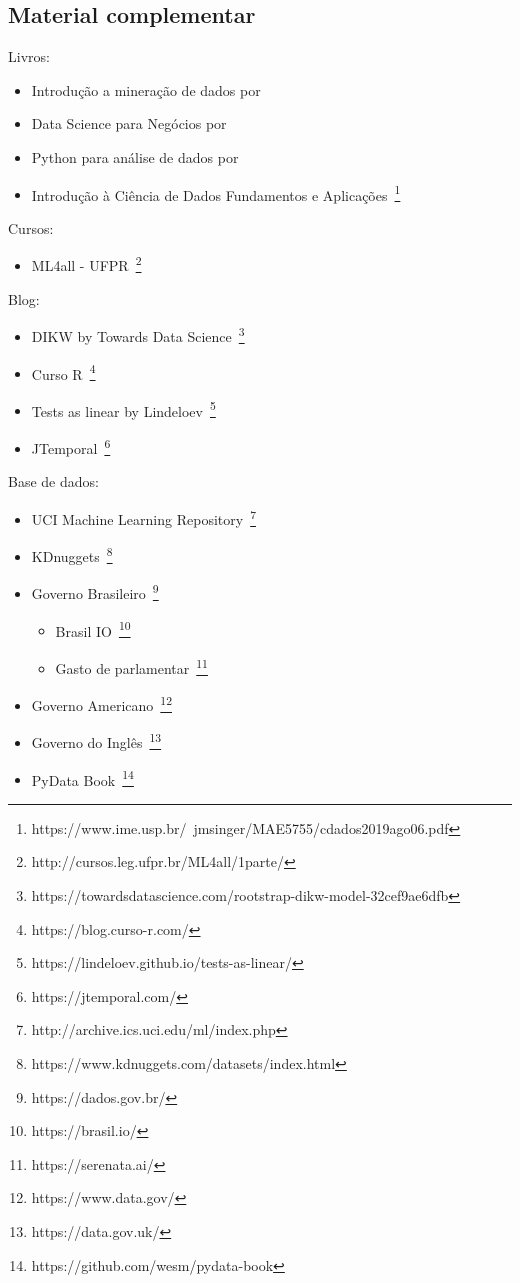 \subsection{Material complementar}

Livros:
\begin{itemize}
	\item Introdução a mineração de dados por~
	\item Data Science para Negócios por~
	\item Python para análise de dados por~
	\item Introdução à Ciência de Dados Fundamentos e Aplicações~\footnote{https://www.ime.usp.br/~jmsinger/MAE5755/cdados2019ago06.pdf}
\end{itemize}


Cursos:
\begin{itemize}
	\item ML4all - UFPR~\footnote{http://cursos.leg.ufpr.br/ML4all/1parte/}
\end{itemize}


Blog:
\begin{itemize}
	\item DIKW by Towards Data Science~\footnote{https://towardsdatascience.com/rootstrap-dikw-model-32cef9ae6dfb}
	\item Curso R~\footnote{https://blog.curso-r.com/}
	\item Tests as linear by Lindeloev~\footnote{https://lindeloev.github.io/tests-as-linear/}
	\item JTemporal~\footnote{https://jtemporal.com/}
\end{itemize}


Base de dados:
\begin{itemize}
	\item UCI Machine Learning Repository~\footnote{http://archive.ics.uci.edu/ml/index.php}
	\item KDnuggets~\footnote{https://www.kdnuggets.com/datasets/index.html}
	\item Governo Brasileiro~\footnote{https://dados.gov.br/}
	      \begin{itemize}
		      \item Brasil IO~\footnote{https://brasil.io/}
		      \item Gasto de parlamentar~\footnote{https://serenata.ai/}
	      \end{itemize}
	\item Governo Americano~\footnote{https://www.data.gov/}
	\item Governo do Inglês~\footnote{https://data.gov.uk/}
	\item PyData Book~\footnote{https://github.com/wesm/pydata-book}
\end{itemize}
